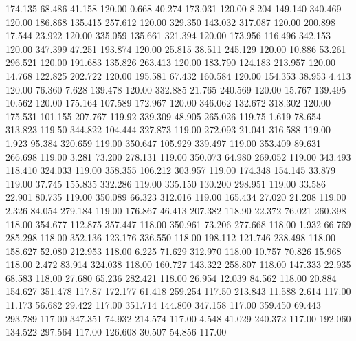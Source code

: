  174.135   68.486   41.158       120.00
   0.668   40.274  173.031       120.00
   8.204  149.140  340.469       120.00
 186.868  135.415  257.612       120.00
 329.350  143.032  317.087       120.00
 200.898   17.544   23.922       120.00
 335.059  135.661  321.394       120.00
 173.956  116.496  342.153       120.00
 347.399   47.251  193.874       120.00
  25.815   38.511  245.129       120.00
  10.886   53.261  296.521       120.00
 191.683  135.826  263.413       120.00
 183.790  124.183  213.957       120.00
  14.768  122.825  202.722       120.00
 195.581   67.432  160.584       120.00
 154.353   38.953    4.413       120.00
  76.360    7.628  139.478       120.00
 332.885   21.765  240.569       120.00
  15.767  139.495   10.562       120.00
 175.164  107.589  172.967       120.00
 346.062  132.672  318.302       120.00
 175.531  101.155  207.767       119.92
 339.309   48.905  265.026       119.75
   1.619   78.654  313.823       119.50
 344.822  104.444  327.873       119.00
 272.093   21.041  316.588       119.00
   1.923   95.384  320.659       119.00
 350.647  105.929  339.497       119.00
 353.409   89.631  266.698       119.00
   3.281   73.200  278.131       119.00
 350.073   64.980  269.052       119.00
 343.493  118.410  324.033       119.00
 358.355  106.212  303.957       119.00
 174.348  154.145   33.879       119.00
  37.745  155.835  332.286       119.00
 335.150  130.200  298.951       119.00
  33.586   22.901   80.735       119.00
 350.089   66.323  312.016       119.00
 165.434   27.020   21.208       119.00
   2.326   84.054  279.184       119.00
 176.867   46.413  207.382       118.90
  22.372   76.021  260.398       118.00
 354.677  112.875  357.447       118.00
 350.961   73.206  277.668       118.00
   1.932   66.769  285.298       118.00
 352.136  123.176  336.550       118.00
 198.112  121.746  238.498       118.00
 158.627   52.080  212.953       118.00
   6.225   71.629  312.970       118.00
  10.757   70.826   15.968       118.00
   2.472   83.914  324.038       118.00
 160.727  143.322  258.807       118.00
 147.333   22.935   68.583       118.00
  27.680   65.236  282.421       118.00
  26.954   12.039   84.562       118.00
  20.884  154.627  351.478       117.87
 172.177   61.418  259.254       117.50
 213.843   11.588    2.614       117.00
  11.173   56.682   29.422       117.00
 351.714  144.800  347.158       117.00
 359.450   69.443  293.789       117.00
 347.351   74.932  214.574       117.00
   4.548   41.029  240.372       117.00
 192.060  134.522  297.564       117.00
 126.608   30.507   54.856       117.00
